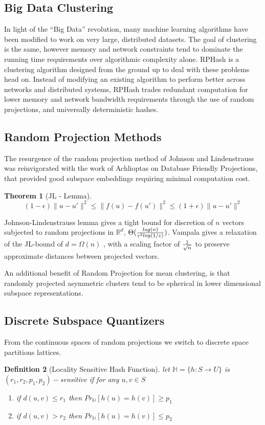 \documentclass[a4paper,10pt]{article}
\newtheorem{Theorem}{Theorem}[section]
\newtheorem{Definition}[Theorem]{Definition}
\begin{document}
\subsection{Big Data Clustering}
In light of the ``Big Data'' revolution, many machine learning algorithms have been modified to work on
very large, distributed datasets. The goal of clustering is the same, however memory and network
constraints tend to dominate the running time requirements over algorithmic complexity alone. RPHash
is a clustering algorithm designed from the ground up to deal with these problems head on. Instead
of modifying an existing algorithm to perform better across networks and distributed systems, RPHash
trades redundant computation for lower memory and network bandwidth requirements through the use
of random projections, and universally deterministic hashes.


\subsection{Random Projection Methods}
The resurgence of the random projection method of Johnson and Lindenstrauss was
reinvigorated with the work of Achlioptas on Database Friendly Projections\cite{Achlioptas01}, that provided
good subspace embeddings requiring minimal computation cost.
\begin{Theorem}[JL - Lemma]
 $$
(1-\epsilon) \|u-u'\|^2 \leq \|f(u)-f(u')\|^2 \leq (1+\epsilon) \| u-u' \|^2
$$
\end{Theorem}
Johnson-Lindenstrauss lemma gives a tight bound for discretion of $n$ vectors
subjected to random projections in $\mathbb{R}^d$, $\Theta( {{log(n)}\over
  {\varepsilon^2 log(1/\varepsilon) }})$.
Vampala gives a relaxation of the JL-bound of $d = \Omega(n)$ \cite{Vempala}, with a scaling factor of ${{1}\over{\sqrt{n}}}$
to preserve approximate distances between projected vectors.

An additional benefit of Random Projection for mean clustering, is that randomly projected asymmetric clusters
tend to be spherical in lower dimensional subspace representations\cite{bingham}.

\subsection{Discrete Subspace Quantizers}
From the continuous spaces of random projections we switch to discrete space partitions lattices. 
\begin{Definition}[Locality Sensitive Hash Function]
let $\mathbb{H}=\{h:S \rightarrow U\}$ is $(r_1,r_2,p_1,p_2)-$sensitive if for any $u,v\in S$
 \begin{enumerate}
   \item if $d(u,v) \leq r_1$ then $Pr_{\mathbb{H}}[h(u)=h(v)]\geq p_1$
   \item if $d(u,v) > r_2$ then $Pr_{\mathbb{H}}[h(u)=h(v)]\leq p_2$
 \end{enumerate}
\end{Definition}
\end{document}
